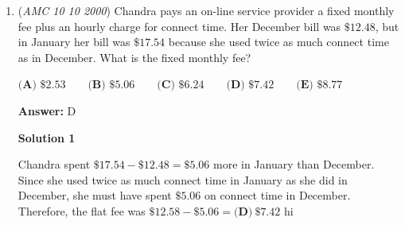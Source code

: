 \begin{enumerate}
 $\textbf{(A)}\ 40 \qquad\textbf{(B)}\ 50 \qquad\textbf{(C)}\ 55 \qquad\textbf{(D)}\ 60 \qquad\textbf{(E)}\ 75$

 \textbf{Answer: }B



\textbf{Solution 1 (Algebra)}

Let $x$ be the number of jellybeans originally in the jar. Then after one day, there were $0.8x$ jellybeans left, while after two days, there were $0.8(0.8x)=0.64x$ jellybeans left.  So $0.64x = 32$ and thus $x = \boxed{\textbf{(B)}\ 50}$.

 -armang32324, edited by j314andrews

 



\textbf{Solution 2}

At the end of the day, $80\% = \frac{4}{5}$ of the jellybeans from the start of the day remained.  So after one day, there were $32 \div \frac{4}{5} = 40$ jellybeans left, while at the start, there were $40 \div \frac{4}{5} = \boxed{\textbf{(B)}\ 50}$ jellybeans left.

 



\textbf{Solution 3 (Answer Choices)}

Starting with each answer choice (A) through (E) results in $25.6$, $32$, $35.2$, $38.4$, and $48$ jellybeans left after two days, respectively.  So $\boxed{\textbf{(B)} \ 50}$ is correct.

 


	\item (\textit{AMC 10 10 2000}) Chandra pays an on-line service provider a fixed monthly fee plus an hourly charge for connect time. Her December bill was $\$12.48$, but in January her bill was $\$17.54$ because she used twice as much connect time as in December. What is the fixed monthly fee?


 $\textbf{(A) } \$2.53 \qquad\textbf{(B) } \$5.06 \qquad\textbf{(C) } \$6.24 \qquad\textbf{(D) } \$7.42 \qquad\textbf{(E) } \$8.77$

 \textbf{Answer: }D



\textbf{Solution 1}

Chandra spent $\$17.54 - \$12.48 = \$5.06$ more in January than December.  Since she used twice as much connect time in January as she did in December, she must have spent $\$5.06$ on connect time in December.  Therefore, the flat fee was $\$12.58 - \$5.06 = \boxed{\textbf{(D)}\ \$7.42}$ hi


\end{enumerate}
